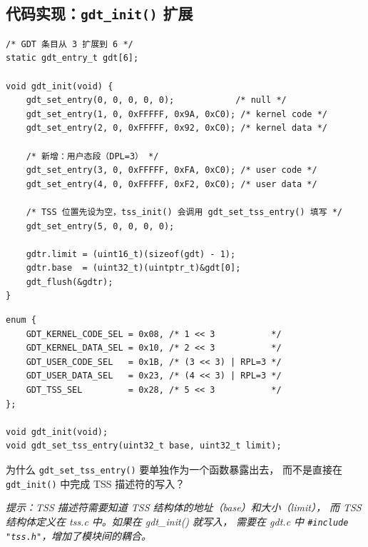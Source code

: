 \subsection{代码实现：\texttt{gdt\_init()} 扩展}

\begin{lstlisting}[style=cstyle]
/* GDT 条目从 3 扩展到 6 */
static gdt_entry_t gdt[6];

void gdt_init(void) {
    gdt_set_entry(0, 0, 0, 0, 0);            /* null */
    gdt_set_entry(1, 0, 0xFFFFF, 0x9A, 0xC0); /* kernel code */
    gdt_set_entry(2, 0, 0xFFFFF, 0x92, 0xC0); /* kernel data */

    /* 新增：用户态段（DPL=3） */
    gdt_set_entry(3, 0, 0xFFFFF, 0xFA, 0xC0); /* user code */
    gdt_set_entry(4, 0, 0xFFFFF, 0xF2, 0xC0); /* user data */

    /* TSS 位置先设为空，tss_init() 会调用 gdt_set_tss_entry() 填写 */
    gdt_set_entry(5, 0, 0, 0, 0);

    gdtr.limit = (uint16_t)(sizeof(gdt) - 1);
    gdtr.base  = (uint32_t)(uintptr_t)&gdt[0];
    gdt_flush(&gdtr);
}
\end{lstlisting}

\begin{lstlisting}[style=cstyle]
enum {
    GDT_KERNEL_CODE_SEL = 0x08, /* 1 << 3           */
    GDT_KERNEL_DATA_SEL = 0x10, /* 2 << 3           */
    GDT_USER_CODE_SEL   = 0x1B, /* (3 << 3) | RPL=3 */
    GDT_USER_DATA_SEL   = 0x23, /* (4 << 3) | RPL=3 */
    GDT_TSS_SEL         = 0x28, /* 5 << 3           */
};

void gdt_init(void);
void gdt_set_tss_entry(uint32_t base, uint32_t limit);
\end{lstlisting}

\begin{thinkbox}
为什么 \texttt{gdt\_set\_tss\_entry()} 要单独作为一个函数暴露出去，
而不是直接在 \texttt{gdt\_init()} 中完成 TSS 描述符的写入？

\emph{提示：TSS 描述符需要知道 TSS 结构体的地址（base）和大小（limit），
而 TSS 结构体定义在 tss.c 中。如果在 gdt\_init() 就写入，
需要在 gdt.c 中 \texttt{\#include "tss.h"}，增加了模块间的耦合。}
\end{thinkbox}
